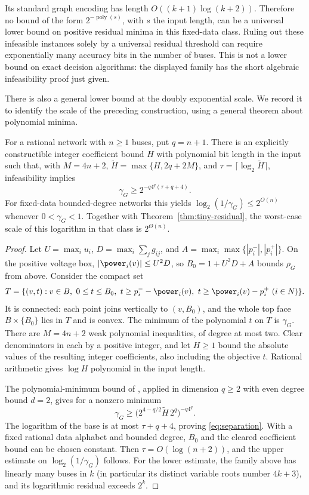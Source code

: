 Its standard graph encoding has length $O((k+1)\log(k+2))$. Therefore no
bound of the form $2^{-\operatorname{poly}(s)}$, with $s$ the input length,
can be a universal lower bound on positive residual minima in this fixed-data
class. Ruling out these infeasible instances solely by a universal residual
threshold can require exponentially many accuracy bits in the number of
buses. This is not a lower bound on exact decision algorithms: the displayed
family has the short algebraic infeasibility proof just given.

There is also a general lower bound at the doubly exponential scale. We
record it to identify the scale of the preceding construction, using a
general theorem about polynomial minima.

\begin{proposition}
\label{prop:residual-separation}
For a rational network with $n\ge1$ buses, put $q=n+1$.
There is an explicitly constructible integer coefficient bound $H$ with
polynomial bit length in the input such that, with
$M=4n+2$, $\widetilde H=\max\{H,2q+2M\}$, and
$\tau=\lceil\log_2\widetilde H\rceil$, infeasibility implies
\begin{equation}
 \gamma_G\ge 2^{-q4^q(\tau+q+4)}.
 \label{eq:separation}
\end{equation}
For fixed-data bounded-degree networks this yields
$\log_2(1/\gamma_G)\le2^{O(n)}$ whenever $0<\gamma_G<1$.
Together with Theorem~\ref{thm:tiny-residual}, the worst-case scale of
this logarithm in that class is $2^{\Theta(n)}$.
\end{proposition}
\begin{proof}
Let $U=\max_i u_i$, $D=\max_i\sum_j g_{ij}$, and
$A=\max_i\max\{|p_i^-|,|p_i^+|\}$.
On the positive voltage box, $|\power_i(v)|\le U^2D$, so
$B_0=1+U^2D+A$ bounds $\rho_G$ from above. Consider the compact set
\[
 T=\{(v,t):v\in B,\ 0\le t\le B_0,\
             t\ge p_i^- -\power_i(v),\
             t\ge\power_i(v)-p_i^+\ (i\in N)\}.
\]
It is connected: each point joins vertically to $(v,B_0)$, and the whole
top face $B\times\{B_0\}$ lies in $T$ and is convex. The minimum of
the polynomial $t$ on $T$ is $\gamma_G$.
There are $M=4n+2$ weak polynomial inequalities, of degree at most two.
Clear denominators in each by a positive integer, and let $H\ge1$ bound
the absolute values of the resulting integer coefficients, also including
the objective $t$. Rational arithmetic gives $\log H$ polynomial in the
input length.

The polynomial-minimum bound of
\citet[Theorem 1.1]{JeronimoEtAl2013}, applied in dimension $q\ge2$
with even degree bound $d=2$, gives for a nonzero minimum
\[
 \gamma_G\ge
  \bigl(2^{4-q/2}\widetilde H\,2^q\bigr)^{-q4^q}.
\]
The logarithm of the base is at most $\tau+q+4$, proving
\eqref{eq:separation}. With a fixed rational data alphabet and bounded
degree, $B_0$ and the cleared coefficient bound can be chosen constant.
Then $\tau=O(\log(n+2))$, and the upper estimate on
$\log_2(1/\gamma_G)$ follows. For the lower estimate, the family above
has linearly many buses in $k$ (in particular its distinct variable roots
number $4k+3$), and its logarithmic residual exceeds $2^k$.
\end{proof}

